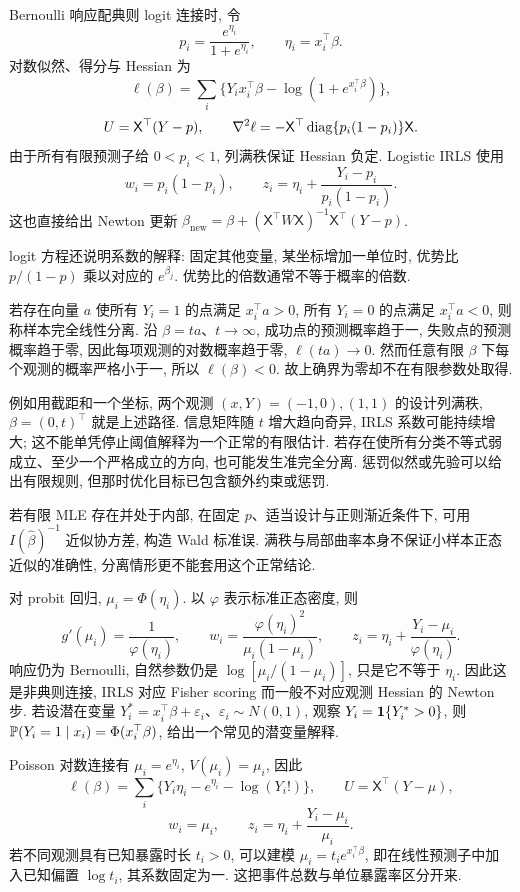 Bernoulli 响应配典则 logit 连接时, 令
\[
 p_i=\frac{e^{\eta_i}}{1+e^{\eta_i}},\qquad\eta_i=x_i^\top\beta.
\]
对数似然、得分与 Hessian 为
\[
 \ell(\beta)=\sum_i\{Y_ix_i^\top\beta-\log(1+e^{x_i^\top\beta})\},
\]
\[
 U=\mathsf X^\top(Y-p),\qquad
 \nabla^2\ell=-\mathsf X^\top\operatorname{diag}\{p_i(1-p_i)\}\mathsf X.
\]
由于所有有限预测子给 $0<p_i<1$, 列满秩保证 Hessian 负定. Logistic IRLS 使用
\[
 w_i=p_i(1-p_i),\qquad
 z_i=\eta_i+\frac{Y_i-p_i}{p_i(1-p_i)}.
\]
这也直接给出 Newton 更新 $\beta_{\mathrm{new}}=\beta+(\mathsf X^\top W\mathsf X)^{-1}\mathsf X^\top(Y-p)$. 

logit 方程还说明系数的解释: 固定其他变量, 某坐标增加一单位时, 优势比 $p/(1-p)$ 乘以对应的 $e^{\beta_j}$. 优势比的倍数通常不等于概率的倍数. 

\begin{example}
若存在向量 $a$ 使所有 $Y_i=1$ 的点满足 $x_i^\top a>0$, 所有 $Y_i=0$ 的点满足 $x_i^\top a<0$, 则称样本完全线性分离. 沿 $\beta=ta$、$t\to\infty$, 成功点的预测概率趋于一, 失败点的预测概率趋于零, 因此每项观测的对数概率趋于零, $\ell(ta)\to0$. 然而任意有限 $\beta$ 下每个观测的概率严格小于一, 所以 $\ell(\beta)<0$. 故上确界为零却不在有限参数处取得. 
\end{example}
例如用截距和一个坐标, 两个观测 $(x,Y)=(-1,0),(1,1)$ 的设计列满秩, $\beta=(0,t)^\top$ 就是上述路径. 信息矩阵随 $t$ 增大趋向奇异, IRLS 系数可能持续增大; 这不能单凭停止阈值解释为一个正常的有限估计. 若存在使所有分类不等式弱成立、至少一个严格成立的方向, 也可能发生准完全分离. 惩罚似然或先验可以给出有限规则, 但那时优化目标已包含额外约束或惩罚. 

若有限 MLE 存在并处于内部, 在固定 $p$、适当设计与正则渐近条件下, 可用 $I(\widehat\beta)^{-1}$ 近似协方差, 构造 Wald 标准误. 满秩与局部曲率本身不保证小样本正态近似的准确性, 分离情形更不能套用这个正常结论. 

对 probit 回归, $\mu_i=\Phi(\eta_i)$. 以 $\varphi$ 表示标准正态密度, 则
\[
 g'(\mu_i)=\frac1{\varphi(\eta_i)},\qquad
 w_i=\frac{\varphi(\eta_i)^2}{\mu_i(1-\mu_i)},\qquad
 z_i=\eta_i+\frac{Y_i-\mu_i}{\varphi(\eta_i)}.
\]
响应仍为 Bernoulli, 自然参数仍是 $\log[\mu_i/(1-\mu_i)]$, 只是它不等于 $\eta_i$. 因此这是非典则连接, IRLS 对应 Fisher scoring 而一般不对应观测 Hessian 的 Newton 步. 若设潜在变量 $Y_i^*=x_i^\top\beta+\varepsilon_i$、$\varepsilon_i\sim N(0,1)$, 观察 $Y_i=\mathbf 1\{Y_i^*>0\}$, 则 $\mathbb P(Y_i=1\mid x_i)=\Phi(x_i^\top\beta)$, 给出一个常见的潜变量解释. 

Poisson 对数连接有 $\mu_i=e^{\eta_i}$, $V(\mu_i)=\mu_i$, 因此
\[
 \ell(\beta)=\sum_i\{Y_i\eta_i-e^{\eta_i}-\log(Y_i!)\},\qquad
 U=\mathsf X^\top(Y-\mu),
\]
\[
 w_i=\mu_i,\qquad z_i=\eta_i+\frac{Y_i-\mu_i}{\mu_i}.
\]
若不同观测具有已知暴露时长 $t_i>0$, 可以建模 $\mu_i=t_i e^{x_i^\top\beta}$, 即在线性预测子中加入已知偏置 $\log t_i$, 其系数固定为一. 这把事件总数与单位暴露率区分开来. 

